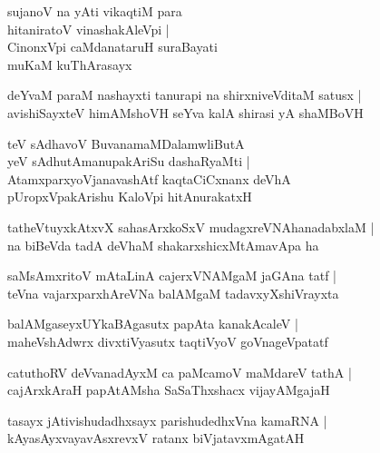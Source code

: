 \documentclass[twoside,12pt,openright]{book}
\newcounter{shloka}[chapter]
\begin{document}
\begin{shloka}%
sujanoV na yAti vikaqtiM para \\
hitaniratoV vinashakAleVpi |\\
CinonxVpi caMdanataruH suraBayati\\
muKaM kuThArasayx  
\end{shloka}

\begin{shloka}%
deYvaM paraM nashayxti tanurapi na shirxniveVditaM satusx |\\
avishiSayxteV himAMshoVH seYva kalA shirasi yA shaMBoVH
\end{shloka}

\begin{shloka}%
teV sAdhavoV BuvanamaMDalamwliButA \\
yeV sAdhutAmanupakAriSu dashaRyaMti |\\
AtamxparxyoVjanavashAtf kaqtaCiCxnanx deVhA \\
pUropxVpakArishu KaloVpi hitAnurakatxH
\end{shloka}

\begin{shloka}%
tatheVtuyxkAtxvX sahasArxkoSxV mudagxreVNAhanadabxlaM |\\
na biBeVda tadA deVhaM shakarxshicxMtAmavApa ha 
\end{shloka}

\begin{shloka}%
saMsAmxritoV mAtaLinA cajerxVNAMgaM jaGAna tatf |\\
teVna vajarxparxhAreVNa balAMgaM tadavxyXshiVrayxta
\end{shloka}

\begin{shloka}%
balAMgaseyxUYkaBAgasutx papAta kanakAcaleV |\\
maheVshAdwrx divxtiVyasutx taqtiVyoV goVnageVpatatf
\end{shloka}

\begin{shloka}%
catuthoRV deVvanadAyxM ca paMcamoV maMdareV tathA |\\
cajArxkAraH papAtAMsha SaSaThxshacx vijayAMgajaH 
\end{shloka}

\begin{shloka}%
tasayx jAtivishudadhxsayx parishudedhxVna kamaRNA |\\
kAyasAyxvayavAsxrevxV ratanx biVjatavxmAgatAH
\end{shloka}
\end{document}
